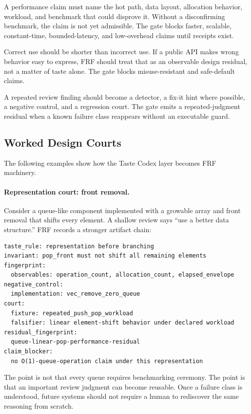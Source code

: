 \documentclass[11pt,a4paper]{article}
\newcommand{\frf}{\textsc{FRF}}
\begin{document}
\begin{description}[leftmargin=2.7cm,style=nextline]
\item[Performance grounding.] A performance claim must name the hot path, data layout, allocation behavior, workload, and benchmark that could disprove it. Without a disconfirming benchmark, the claim is not yet admissible. The gate blocks faster, scalable, constant-time, bounded-latency, and low-overhead claims until receipts exist.
\item[Misuse resistance.] Correct use should be shorter than incorrect use. If a public API makes wrong behavior easy to express, \frf{} should treat that as an observable design residual, not a matter of taste alone. The gate blocks misuse-resistant and safe-default claims.
\item[Tooling that teaches.] A repeated review finding should become a detector, a fix-it hint where possible, a negative control, and a regression court. The gate emits a repeated-judgment residual when a known failure class reappears without an executable guard.
\end{description}

\subsection{Worked Design Courts}

The following examples show how the Taste Codex layer becomes \frf{} machinery.

\paragraph{Representation court: front removal.}

Consider a queue-like component implemented with a growable array and front removal that shifts every element. A shallow review says ``use a better data structure.'' \frf{} records a stronger artifact chain:

\begin{verbatim}
taste_rule: representation before branching
invariant: pop_front must not shift all remaining elements
fingerprint:
  observables: operation_count, allocation_count, elapsed_envelope
negative_control:
  implementation: vec_remove_zero_queue
court:
  fixture: repeated_push_pop_workload
  falsifier: linear element-shift behavior under declared workload
residual_fingerprint:
  queue-linear-pop-performance-residual
claim_blocker:
  no O(1)-queue-operation claim under this representation
\end{verbatim}

The point is not that every queue requires benchmarking ceremony. The point is that an important review judgment can become reusable. Once a failure class is understood, future systems should not require a human to rediscover the same reasoning from scratch.
\end{document}
